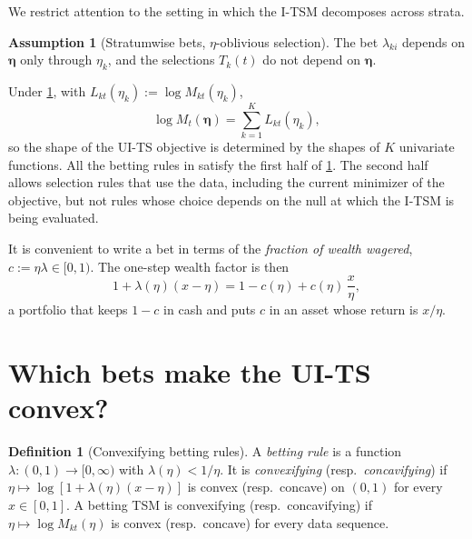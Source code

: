\documentclass[11pt]{article}
\newcommand{\bs}{\boldsymbol}
\theoremstyle{plain}
\theoremstyle{definition}
\newtheorem{definition}[theorem]{Definition}
\newtheorem{assumption}{Assumption}
\theoremstyle{remark}
\begin{document}
We restrict attention to the setting in which the I-TSM decomposes across strata.

\begin{assumption}[Stratumwise bets, $\eta$-oblivious selection]\label{ass:separable}
The bet $\lambda_{ki}$ depends on $\bs\eta$ only through $\eta_k$, and the selections $T_k(t)$ do not depend on $\bs\eta$.
\end{assumption}

Under \cref{ass:separable}, with $L_{kt}(\eta_k) := \log M_{kt}(\eta_k)$,
\begin{equation}\label{eq:separable}
\log M_t(\bs\eta) = \sum_{k=1}^K L_{kt}(\eta_k),
\end{equation}
so the shape of the UI-TS objective is determined by the shapes of $K$ univariate functions.  All the betting rules
in \citet{spertus2024sequential} satisfy the first half of \cref{ass:separable}.  The second half allows selection
rules that use the data, including the current minimizer of the objective, but not rules whose choice depends on the
null at which the I-TSM is being evaluated.

It is convenient to write a bet in terms of the \emph{fraction of wealth wagered}, $c := \eta\lambda \in [0,1)$.  The
one-step wealth factor is then
\begin{equation}\label{eq:fraction}
1 + \lambda(\eta)(x-\eta) = 1 - c(\eta) + c(\eta)\,\frac{x}{\eta},
\end{equation}
a portfolio that keeps $1-c$ in cash and puts $c$ in an asset whose return is $x/\eta$.

\section{Which bets make the UI-TS convex?}\label{sec:convex}

\begin{definition}[Convexifying betting rules]\label{def:rules}
A \emph{betting rule} is a function $\lambda:(0,1)\to[0,\infty)$ with $\lambda(\eta) < 1/\eta$.  It is \emph{convexifying}
(resp.\ \emph{concavifying}) if $\eta\mapsto \log[1+\lambda(\eta)(x-\eta)]$ is convex (resp.\ concave) on $(0,1)$ for
every $x\in[0,1]$.  A betting TSM is convexifying (resp.\ concavifying) if $\eta\mapsto\log M_{kt}(\eta)$ is convex
(resp.\ concave) for every data sequence.
\end{definition}
\end{document}
